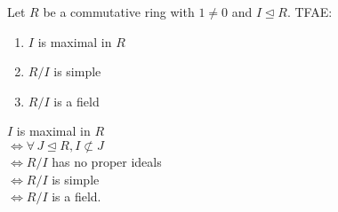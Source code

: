 \documentclass[letterpaper,12pt,fleqn]{article}
\newcommand{\ide}{\trianglelefteq}
\begin{document}
\begin{theorem}
  Let $R$ be a commutative ring with $1\ne0$ and $I\ide R$. TFAE:
  \begin{enumerate}
  \item $I$ is maximal in $R$
  \item $R/I$ is simple
  \item $R/I$ is a field
  \end{enumerate}
\end{theorem}
\newpage
\begin{theproof}
  $I$ is maximal in $R$ \\
  $\iff \forall\,J\ide R,I\not\subset J$ \\
  $\iff R/I$ has no proper ideals \\
  $\iff R/I$ is simple \\
  $\iff R/I$ is a field.
\end{theproof}
\end{document}
